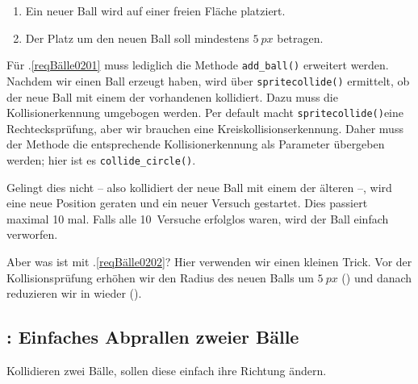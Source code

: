 \begin{enumerate}
    \item Ein neuer Ball wird auf einer freien Fläche platziert.\label{reqBälle0201}
    \item Der Platz um den neuen Ball soll mindestens $5~px$ betragen.\label{reqBälle0202}
\end{enumerate}
\er

Für .\ref{reqBälle0201} muss lediglich die Methode \texttt{add\_ball()} erweitert werden. Nachdem wir einen Ball erzeugt haben, wird über \texttt{spritecollide()}  ermittelt, ob der neue Ball mit einem der vorhandenen kollidiert. Dazu muss die Kollisionerkennung umgebogen werden. Per default macht \texttt{spritecollide()}eine Rechtecksprüfung, aber wir brauchen eine Kreiskollisionserkennung. Daher muss der Methode die entsprechende Kollisionerkennung als Parameter übergeben werden; hier ist es \texttt{collide\_circle()}.

Gelingt dies nicht -- also kollidiert der neue Ball mit einem der älteren --, wird eine neue Position geraten und ein neuer Versuch gestartet. Dies passiert maximal 10 mal. Falls alle 10~Versuche erfolglos waren, wird der Ball einfach verworfen.


Aber was ist mit .\ref{reqBälle0202}? Hier verwenden wir einen kleinen Trick. Vor der Kollisionsprüfung erhöhen wir den Radius des neuen Balls um $5~px$ () und danach reduzieren wir in wieder ().


\subsection{: Einfaches Abprallen zweier Bälle}

Kollidieren zwei Bälle, sollen diese einfach ihre Richtung ändern.\label{reqBälle0301}
\er

